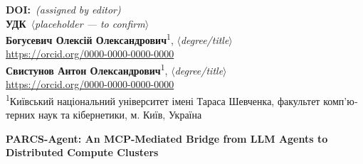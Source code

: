 
\noindent
\textbf{DOI:}~\textit{(assigned by editor)}\\
\textbf{УДК}~\textit{$\langle$placeholder — to confirm$\rangle$}\\[0.4em]
\textbf{Богусевич Олексій Олександрович}\textsuperscript{1},
  \textit{$\langle$degree/title$\rangle$}\\
\href{https://orcid.org/0000-0000-0000-0000}{https://orcid.org/0000-0000-0000-0000}\\
\textbf{Свистунов Антон Олександрович}\textsuperscript{1},
  \textit{$\langle$degree/title$\rangle$}\\
\href{https://orcid.org/0000-0000-0000-0000}{https://orcid.org/0000-0000-0000-0000}\\
\textsuperscript{1}\foreignlanguage{ukrainian}{Київський національний університет імені Тараса Шевченка, факультет комп'ютерних наук та кібернетики, м. Київ, Україна}\\

\begin{center}
{\fontsize{14}{16}\selectfont\textbf{PARCS-Agent: An MCP-Mediated Bridge from LLM Agents to Distributed Compute Clusters}}
\end{center}
